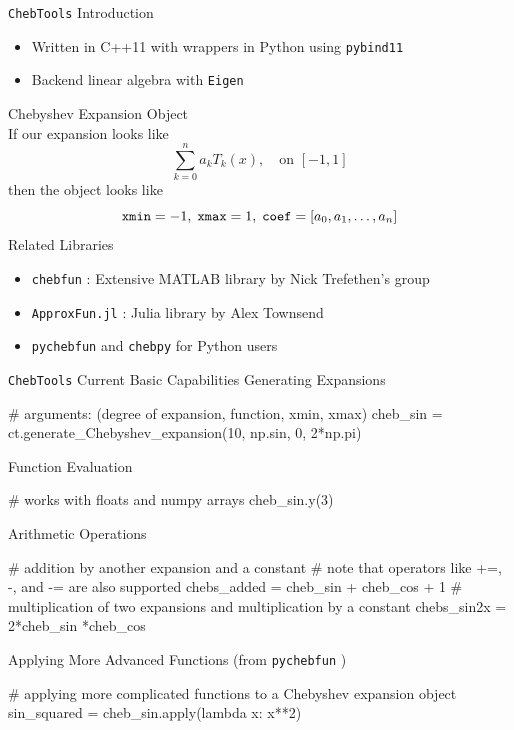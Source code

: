 \documentclass[final]{beamer}
\begin{document}
\begin{frame}[fragile]{}
\begin{columns}[t]
\begin{column}{.31\linewidth}
\begin{block}{{\tt ChebTools} Introduction}
\begin{itemize}
\item Written in C++11 with wrappers in Python using {\tt pybind11} \cite{pybind11}
\item Backend linear algebra with {\tt Eigen} \cite{eigen}						%
\end{itemize}
{\color{numhypRed} Chebyshev Expansion Object}\\
If our expansion looks like 
$$\sum_{k=0}^{n}a_kT_k(x), \quad \text{on $[-1, 1]$}$$ 
then the object looks like
$$ {\tt xmin} = -1, \; {\tt xmax} = 1, \; {\tt coef} = [a_0, a_1, \ldots, a_n]$$
{\color{numhypRed} Related Libraries}
\begin{itemize}
\item {\tt chebfun} \cite{driscoll_2014}: Extensive MATLAB library by Nick Trefethen's group
\item {\tt ApproxFun.jl} \cite{approxfun}: Julia library by Alex Townsend
\item {\tt pychebfun}\cite{pychebfun} and {\tt chebpy}\cite{chebpy} for Python users
\end{itemize}

\end{block}

\begin{block}{{\tt ChebTools} Current Basic Capabilities}
{\color{numhypRed} Generating Expansions}\\
\begin{python}
# arguments: (degree of expansion, function, xmin, xmax)
cheb_sin = ct.generate_Chebyshev_expansion(10, np.sin, 0, 2*np.pi)
\end{python}
{\color{numhypRed} Function Evaluation}\\
\begin{python}
# works with floats and numpy arrays
cheb_sin.y(3)
\end{python}
{\color{numhypRed} Arithmetic Operations}\\
\begin{python}
# addition by another expansion and a constant
# note that operators like +=, -, and -= are also supported
chebs_added = cheb_sin + cheb_cos + 1
# multiplication of two expansions and multiplication by a constant
chebs_sin2x = 2*cheb_sin *cheb_cos
\end{python}
{\color{numhypRed} Applying More Advanced Functions (from {\tt pychebfun} \cite{pychebfun})}\\
\begin{python}
# applying more complicated functions to a Chebyshev expansion object
sin_squared = cheb_sin.apply(lambda x: x**2)
\end{python}
\vspace{3mm}
\end{block}
\end{column}



\end{columns}
\end{frame}
\end{document}
